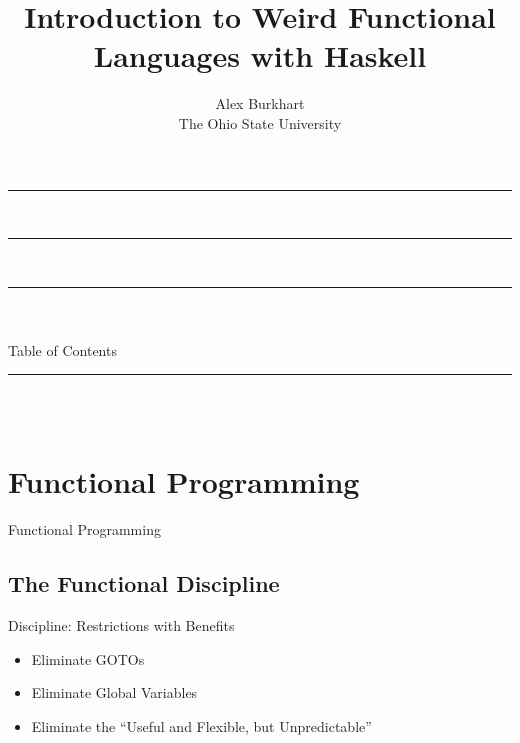 \documentclass{beamer}                  %
\title{Introduction to Weird Functional Languages with Haskell}    %
\author{
	Alex Burkhart\\          %
	The Ohio State University\\          %
}
\newcommand{\srule}{
	\rule{\textwidth}{1pt}\\
}
\newlength{\subsecwidth}
\newenvironment{slide}{
	\begin{frame} %
	\settowidth{\subsecwidth}{\insertsubsection} %
	\ifthenelse{\dimtest{\subsecwidth}{<}{1pt}}{ %
		\frametitle{\insertsection\\             %
		\vspace{-1ex}                            %
		\color{fore}\srule                       %
		\par                                     %
		\vspace{-3ex}                            %
		}
	}{                                           %
		\frametitle{\insertsection\ -- \insertsubsection\\ %
		\vspace{-1ex}                            %
		\color{fore}\srule                       %
		\par                                     %
		\vspace{-3ex}                            %
		}
	}
	\Large                                       %
}{
	\end{frame}
}
\newcommand{\titleslide}[1]{
	\section{#1}             %
	\begin{slide}
		\begin{center}
			\color{comments}
			\Huge            %
			#1               %
		\end{center}
	\end{slide}
}
\begin{document}

\begin{frame}                           %
	\srule                              %
	\titlepage                          %
	\srule                              %
\end{frame}

\begin{frame}                           %
	\begin{center}
		\srule                          %
		\vspace{1ex}
		\color{title} \inserttitle\\\color{fore} Table of Contents
		\srule                          %
	\end{center}
	\begin{columns}                     %
		\begin{column}{.5\textwidth}    %
			\tableofcontents[sections={1-3}] %
		\end{column}
		\begin{column}{.5\textwidth}    %
			\tableofcontents[sections={4-6}] %
		\end{column}
	\end{columns}
\end{frame}


\titleslide{Functional Programming}

\subsection{The Functional Discipline}

\begin{slide}
  Discipline: Restrictions with Benefits
  \begin{itemize}
    \item Eliminate GOTOs
    \item Eliminate Global Variables
    \item Eliminate the ``Useful and Flexible, but Unpredictable''
  \end{itemize}
\end{slide}
\end{document}
